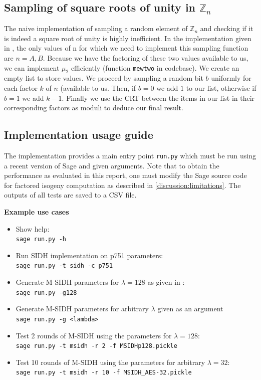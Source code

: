 \documentclass[a4paper,11pt,oneside]{report}
\newcommand{\zn}{$\mathbb{Z}_n$\xspace}
\begin{document}
    \subsection{Sampling of square roots of unity in \zn}

    The naive implementation of sampling a random element of \zn and checking if it is indeed a square root of unity is highly inefficient. In the implementation given in \cite{msidh}, the only values of n for which we need to implement this sampling function are $n=A,B$. Because we have the factoring of these two values available to us, we can implement $\mu_2$ efficiently (function \texttt{mewtwo} in codebase). 
    We create an empty list to store values. We proceed by sampling a random bit $b$ uniformly for each factor $k$ of $n$ (available to us. Then, if $b=0$ we add $1$ to our list, otherwise if $b=1$ we add $k-1$. Finally we use the CRT between the items in our list in their corresponding factors as moduli to deduce our final result.

    \subsection{Implementation usage guide}

    The implementation provides a main entry point \texttt{run.py} which must be run using a recent version of Sage \cite{sagemath} and given arguments. Note that to obtain the performance as evaluated in this report, one must modify the Sage source code for factored isogeny computation as described in \autoref{discussion:limitations}. The outputs of all tests are saved to a CSV file.

    \textbf{Example use cases}
    \begin{itemize}
    
        \item Show help: \\ \texttt{sage run.py -h}
        \item Run SIDH implementation on p751 parameters: \\ \texttt{sage run.py -t sidh -c p751}
        \item Generate M-SIDH parameters for $\lambda = 128$ as given in \cite{msidh}: \\ \texttt{sage run.py -g128}
        \item Generate M-SIDH parameters for arbitrary $\lambda$ given as an argument \cite{msidh}\\ \texttt{sage run.py -g <lambda>}
        \item Test 2 rounds of M-SIDH using the parameters for $\lambda = 128$: \\ 
        \texttt{sage run.py -t msidh -r 2 -f MSIDHp128.pickle}
        \item Test 10 rounds of M-SIDH using the parameters for arbitrary $\lambda = 32$: \\ 
        \texttt{sage run.py -t msidh -r 10 -f MSIDH\_AES-32.pickle }
        
        
    \end{itemize}
\end{document}

